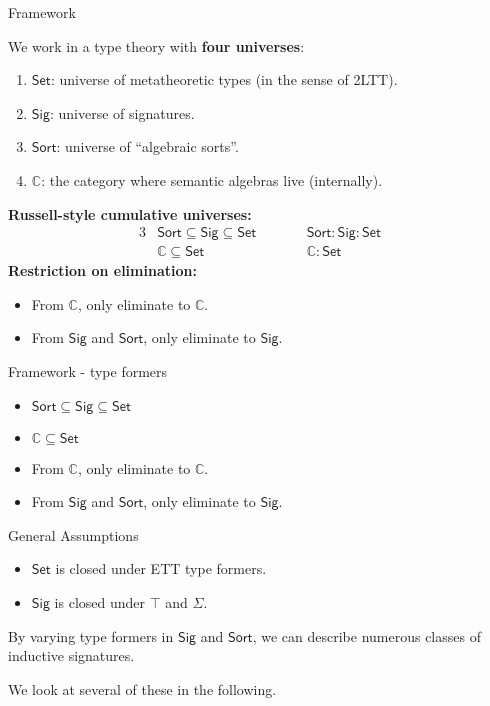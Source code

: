 \documentclass[dvipsnames]{beamer}
\newcommand{\mbb}[1]{\mathbb{#1}}
\newcommand{\Set}{\mathsf{Set}}
\newcommand{\Sort}{\mathsf{Sort}}
\newcommand{\Sig}{\mathsf{Sig}}
\newcommand{\mbbC}{\mbb{C}}
\begin{document}
\begin{frame}{Framework}

We work in a type theory with \textbf{four universes}:
\begin{enumerate}
 \item $\Set$: universe of metatheoretic types (in the sense of 2LTT).
 \item $\Sig$: universe of signatures.
 \item $\Sort$: universe of ``algebraic sorts''.
 \item $\mbbC$: the category where semantic algebras live (internally).
\end{enumerate}
\vspace{1em}
\textbf{Russell-style cumulative universes:}
\begin{alignat*}{3}
  & \Sort \subseteq \Sig \subseteq \Set \hspace{2em} && \Sort : \Sig : \Set\\
  & \mbbC \subseteq \Set                             && \mbbC : \Set
\end{alignat*}
\textbf{Restriction on elimination:}
\begin{itemize}
  \item From $\mbbC$, only eliminate to $\mbbC$.
  \item From $\Sig$ and $\Sort$, only eliminate to $\Sig$.
\end{itemize}

\end{frame}

\begin{frame}{Framework - type formers}

\begin{block}{}
  \begin{itemize}
  \item $\Sort \subseteq \Sig \subseteq \Set$
  \item $\mbbC \subseteq \Set$
  \item From $\mbbC$, only eliminate to $\mbbC$.
  \item From $\Sig$ and $\Sort$, only eliminate to $\Sig$.
  \end{itemize}
\end{block}
\begin{block}{General Assumptions}
  \begin{itemize}
  \item $\Set$ is closed under ETT type formers.
  \item $\Sig$ is closed under $\top$ and $\Sigma$.
  \end{itemize}
\end{block}
\vspace{1em}

By varying type formers in $\Sig$ and $\Sort$, we can describe numerous
classes of inductive signatures.
\vspace{1em}

We look at several of these in the following.
\end{frame}
\end{document}
